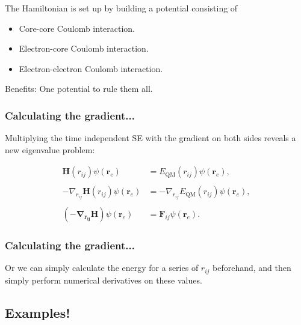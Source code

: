 \documentclass[
paper=128mm:96mm, %
fontsize=11pt, %
pagesize, %
parskip=half-, %
]{scrartcl} %
\theoremstyle{mythmstyle} %
\begin{document}
The Hamiltonian is set up by building a potential consisting of

\begin{itemize}
 \item Core-core Coulomb interaction.
 \item Electron-core Coulomb interaction.
 \item Electron-electron Coulomb interaction.
\end{itemize}

Benefits: One potential to rule them all.

\clearpage



\subsubsection*{Calculating the gradient...}

Multiplying the time independent SE with the gradient on both sides reveals a new eigenvalue problem:

\begin{align*}
 \mathbf{H}(r_{ij})\psi(\mathbf{r}_e) &= E_\mathrm{QM}(r_{ij})\psi(\mathbf{r}_e),\\
 & \\
  -\nabla_{r_{ij}}\mathbf{H}(r_{ij})\psi(\mathbf{r}_e) &=  -\nabla_{r_{ij}}E_\mathrm{QM}(r_{ij})\psi(\mathbf{r}_e),\\
  & \\
  \left(\mathbf{-\nabla_{r_{ij}} H}\right) \psi(\mathbf{r}_e) &= \mathbf{F}_{ij} \psi(\mathbf{r}_e).
\end{align*}



\clearpage

\subsubsection*{Calculating the gradient...}

Or we can simply calculate the energy for a series of $r_{ij}$ beforehand, and then simply perform numerical derivatives on these values.

\clearpage

\subsection{Examples!}
\end{document}
